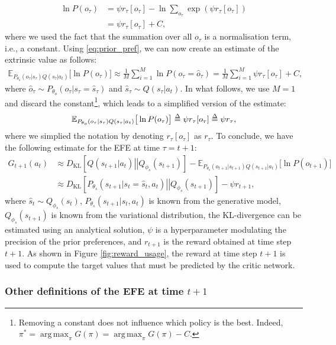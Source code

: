 \documentclass[twoside,11pt]{article}
\newcommand{\kl}[2]{D_{\mathrm{KL}} \left[ \left. \left. #1 \right|\right| #2 \right] }
\DeclareMathOperator*{\argmax}{arg\,max}
\def\delequal{\mathrel{\ensurestackMath{\stackon[1pt]{=}{\scriptstyle\Delta}}}}
\begin{document}
\begin{align}
\ln P(o_\tau) &= \psi r_\tau[o_\tau] - \ln \sum_{o_\tau} \exp(\psi r_\tau[o_\tau])\nonumber\\
&= \psi r_\tau[o_\tau] + C, \label{eq:prior_pref}
\end{align}
where we used the fact that the summation over all $o_\tau$ is a normalisation term, i.e., a constant. Using \eqref{eq:prior_pref}, we can now create an estimate of the extrinsic value as follows:
\begin{align*}
\mathbb{E}_{P_{\theta_o}(o_\tau|s_\tau)Q(s_\tau | a_t)}\big[\ln P(o_\tau)\big] \approx \frac{1}{M} \sum_{i = 1}^M \ln P(o_\tau = \hat{o}_\tau) = \frac{1}{M} \sum_{i = 1}^M \psi r_\tau[o_\tau] + C,
\end{align*}
where $\hat{o}_\tau \sim P_{\theta_o}(o_\tau|s_\tau=\hat{s}_\tau)$ and $\hat{s}_\tau \sim Q(s_\tau | a_t)$. In what follows, we use $M=1$ and discard the constant\footnote{Removing a constant does not influence which policy is the best. Indeed, $\pi^* = \argmax_\pi G(\pi) = \argmax_\pi G(\pi) - C$.}, which leads to a simplified version of the estimate:
\begin{align*}
\mathbb{E}_{P_{\theta_o}(o_\tau|s_\tau)Q(s_\tau | a_t)}\big[\ln P(o_\tau)\big] \delequal \psi r_\tau[o_\tau] \delequal \psi r_\tau,
\end{align*}
where we simplied the notation by denoting $r_\tau[o_\tau]$ as $r_\tau$. To conclude, we have the following estimate for the EFE at time $\tau = t+1$:
\begin{align}
G_{t+1}(a_t) &\approx \kl{Q(s_{t+1} | a_t)}{Q_{\phi_s}(s_{t+1})} - \mathbb{E}_{P_{\theta_o}(o_{t+1}|s_{t+1})Q(s_{t+1} | a_t)}\big[\ln P(o_{t+1})\big]\nonumber\\
&\approx \kl{P_{\theta_s}(s_{t+1}|s_t = \hat{s}_t, a_t)}{Q_{\phi_s}(s_{t+1})} - \psi r_{t+1},
\end{align}
where $\hat{s}_t \sim Q_{\phi_s}(s_t)$, $P_{\theta_s}(s_{t+1}|s_t, a_t)$ is known from the generative model, $Q_{\phi_s}(s_{t+1})$ is known from the variational distribution, the KL-divergence can be estimated using an analytical solution, $\psi$ is a hyperparameter modulating the precision of the prior preferences, and $r_{t+1}$ is the reward obtained at time step $t+1$. As shown in Figure \ref{fig:reward_usage}, the reward at time step $t+1$ is used to compute the target values that must be predicted by the critic network.

\subsubsection{Other definitions of the EFE at time $t + 1$} \label{ssec:efe_other_defe}
\end{document}
